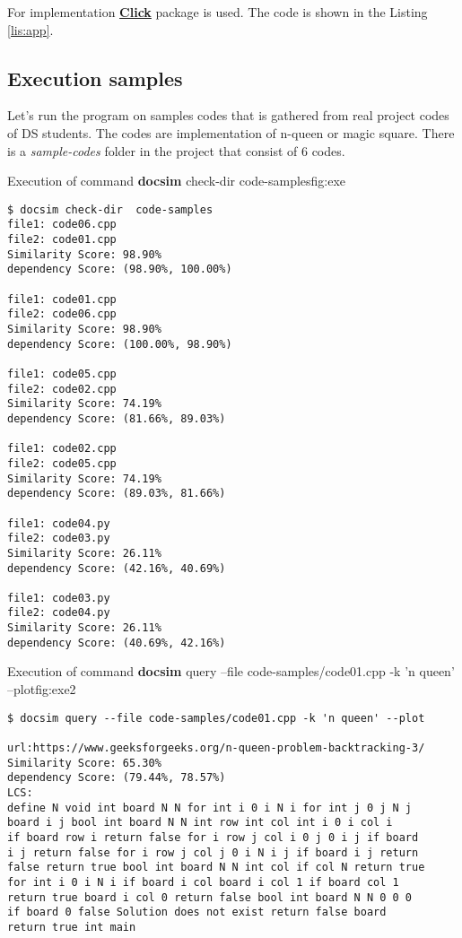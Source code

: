 For implementation \href{https://click.palletsprojects.com/en/7.x/}{\textbf{Click}} package is used. The code
is shown in the Listing \ref{lis:app}.

\subsection{Execution samples}
Let's run the program on samples codes that is gathered from real project
codes of DS students. The codes are implementation of n-queen or magic square. 
There is a \textit{sample-codes} folder in the project that consist of 6 codes.

\begin{fig-terminal}{Execution of command \textsf{\textbf{docsim} check-dir  code-samples}}{fig:exe}
\begin{lstlisting}[style=BASH]
$ docsim check-dir  code-samples
file1: code06.cpp
file2: code01.cpp 
Similarity Score: 98.90%
dependency Score: (98.90%, 100.00%)

file1: code01.cpp
file2: code06.cpp 
Similarity Score: 98.90%
dependency Score: (100.00%, 98.90%)

file1: code05.cpp
file2: code02.cpp 
Similarity Score: 74.19%
dependency Score: (81.66%, 89.03%)

file1: code02.cpp
file2: code05.cpp 
Similarity Score: 74.19%
dependency Score: (89.03%, 81.66%)

file1: code04.py
file2: code03.py 
Similarity Score: 26.11%
dependency Score: (42.16%, 40.69%)

file1: code03.py
file2: code04.py 
Similarity Score: 26.11%
dependency Score: (40.69%, 42.16%)
\end{lstlisting}
\end{fig-terminal}

\begin{fig-terminal}{Execution of command \textsf{\textbf{docsim} query --file code-samples/code01.cpp -k 'n queen' --plot}}{fig:exe2}
\begin{lstlisting}[style=BASH]
$ docsim query --file code-samples/code01.cpp -k 'n queen' --plot

url:https://www.geeksforgeeks.org/n-queen-problem-backtracking-3/ 
Similarity Score: 65.30%
dependency Score: (79.44%, 78.57%)
LCS:
define N void int board N N for int i 0 i N i for int j 0 j N j 
board i j bool int board N N int row int col int i 0 i col i 
if board row i return false for i row j col i 0 j 0 i j if board 
i j return false for i row j col j 0 i N i j if board i j return 
false return true bool int board N N int col if col N return true 
for int i 0 i N i if board i col board i col 1 if board col 1 
return true board i col 0 return false bool int board N N 0 0 0 
if board 0 false Solution does not exist return false board 
return true int main

\end{lstlisting}
\scalebox{.35}{}
\end{fig-terminal}